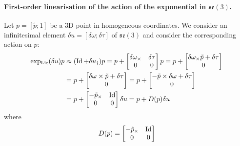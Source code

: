\paragraph{First-order linearisation of the action of the exponential in $\mathfrak{se}(3)$.}
Let $p=[\tilde{p};1]$ be a 3D point in homogeneous coordinates. We consider an infinitesimal element $\delta u=[\delta \omega;\delta \tau]$ of $\mathfrak{se}(3)$ and consider the corresponding action on $p$:
\begin{equation}
\begin{split}
\operatorname{exp_{Lie}}(\delta u)p &\approx (\operatorname{Id}+\delta u_\dagger)p = p +
\begin{bmatrix}
\delta \omega_\times & \delta \tau \\
0  & 0
\end{bmatrix} p
= p +
\begin{bmatrix}
\delta \omega_\times \tilde{p}+\delta \tau \\
0
\end{bmatrix} \\
&= p +
\begin{bmatrix}
\delta \omega \times \tilde{p}+\delta \tau \\
0
\end{bmatrix}
= p +
\begin{bmatrix}
-\tilde{p} \times \delta \omega + \delta \tau \\
0
\end{bmatrix} \\
&= p +
\begin{bmatrix}
-\tilde{p}_\times & \operatorname{Id} \\
0 & 0
\end{bmatrix} \delta u
= p + D(p)\delta u
\end{split}
\end{equation}
where
\begin{equation}
D(p) = 
\begin{bmatrix}
-\tilde{p}_\times & \operatorname{Id} \\
0 & 0
\end{bmatrix}
\end{equation}


